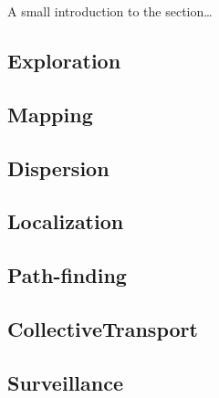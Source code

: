 A small introduction to the section\ldots
    \subsection{Exploration}
    
    \subsection{Mapping}
    
    \subsection{Dispersion}
    
    \subsection{Localization}
    
    \subsection{Path-finding}
    
    \subsection{CollectiveTransport}
    
    \subsection{Surveillance}
    
